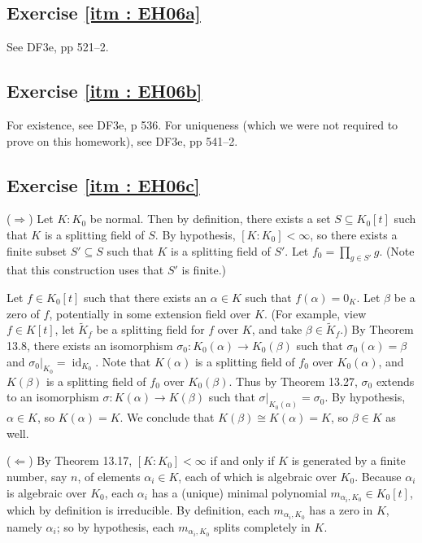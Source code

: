 \documentclass[oneside, english, 11pt]{article}
\DeclareMathOperator{\identityMap}{id}
\newcommand{\isomorphism}{\cong}
\begin{document}
\subsection*{Exercise \ref{itm : EH06a}}

See DF3e, pp 521--2.



\subsection*{Exercise \ref{itm : EH06b}}

For existence, see DF3e, p 536. For uniqueness (which we were not required to prove on this homework), see DF3e, pp 541--2.



\subsection*{Exercise \ref{itm : EH06c}}

($\Rightarrow$) Let $K : K_{0}$ be normal. Then by definition, there exists a set $S \subseteq K_{0}[t]$ such that $K$ is a splitting field of $S$. By hypothesis, $[K : K_{0}] < \infty$, so there exists a finite subset $S' \subseteq S$ such that $K$ is a splitting field of $S'$. Let $f_{0} = \prod_{g \in S'} g$. (Note that this construction uses that $S'$ is finite.)

Let $f \in K_{0}[t]$ such that there exists an $\alpha \in K$ such that $f(\alpha) = 0_{K}$. Let $\beta$ be a zero of $f$, potentially in some extension field over $K$. (For example, view $f \in K[t]$, let $\tilde{K}_{f}$ be a splitting field for $f$ over $K$, and take $\beta \in \tilde{K}_{f}$.) By Theorem 13.8, there exists an isomorphism $\sigma_{0} : K_{0}(\alpha) \rightarrow K_{0}(\beta)$ such that $\sigma_{0}(\alpha) = \beta$ and $\sigma_{0}|_{K_{0}} = \identityMap_{K_{0}}$. Note that $K(\alpha)$ is a splitting field of $f_{0}$ over $K_{0}(\alpha)$, and $K(\beta)$ is a splitting field of $f_{0}$ over $K_{0}(\beta)$. Thus by Theorem 13.27, $\sigma_{0}$ extends to an isomorphism $\sigma : K(\alpha) \rightarrow K(\beta)$ such that $\sigma|_{K_{0}(\alpha)} = \sigma_{0}$. By hypothesis, $\alpha \in K$, so $K(\alpha) = K$. We conclude that $K(\beta) \isomorphism K(\alpha) = K$, so $\beta \in K$ as well.

($\Leftarrow$) By Theorem 13.17, $[K : K_{0}] < \infty$ if and only if $K$ is generated by a finite number, say $n$, of elements $\alpha_{i} \in K$, each of which is algebraic over $K_{0}$. Because $\alpha_{i}$ is algebraic over $K_{0}$, each $\alpha_{i}$ has a (unique) minimal polynomial $m_{\alpha_{i}, K_{0}} \in K_{0}[t]$, which by definition is irreducible. By definition, each $m_{\alpha_{i}, K_{0}}$ has a zero in $K$, namely $\alpha_{i}$; so by hypothesis, each $m_{\alpha_{i}, K_{0}}$ splits completely in $K$.
\end{document}
